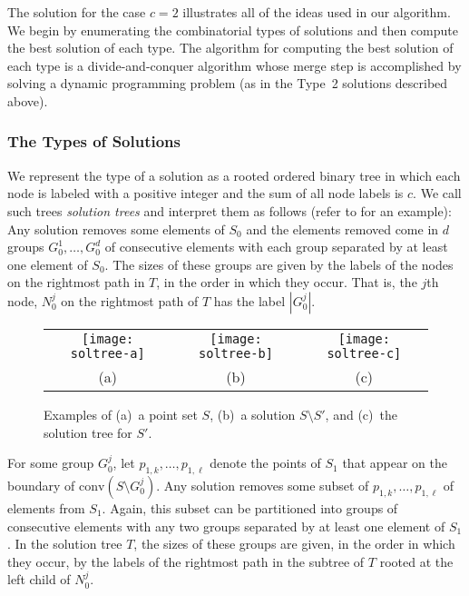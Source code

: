 \documentclass{elsart}
\newcommand{\ch}{\mathrm{conv}}
\begin{document}
The solution for the case $c=2$ illustrates all of the ideas used in 
our algorithm.  We begin by enumerating the combinatorial types of
solutions and then compute the best solution of each type.  The
algorithm for computing the best solution of each type is a
divide-and-conquer algorithm whose merge step is accomplished by
solving a dynamic programming problem (as in the Type~2 solutions
described above).

\subsubsection{The Types of Solutions}

We represent the type of a solution as a rooted ordered binary tree in
which each node is labeled with a positive integer and the sum of all
node labels is $c$.  We call such trees \emph{solution trees}
and interpret them as follows (refer to
 for an example): Any solution removes some
elements of $S_0$ and the elements removed come in $d$ groups
$G_0^1,\ldots,G_0^d$ of consecutive elements with each group separated
by at least one element of $S_0$.  The sizes of these groups are given
by the labels of the nodes on the rightmost path in $T$, in the order
in which they occur.  That is, the $j$th node, $N_0^j$ on the
rightmost path of $T$ has the label $|G_0^j|$. 

\begin{figure}
\begin{center}
\begin{tabular}{ccc}
\texttt{[image: soltree-a]} & 
\texttt{[image: soltree-b]} &
\texttt{[image: soltree-c]} \\
(a) & (b) & (c)
\end{tabular}
\end{center}
\caption{Examples of (a)~a point set $S$, (b)~a solution
$S\setminus S'$, and (c)~the solution tree for $S'$.}
\end{figure}

For some group $G_0^j$, let $p_{1,k}, \ldots, p_{1,\ell}$ denote the
points of $S_1$ that appear on the boundary of $\ch(S\setminus
G_0^j)$.  Any solution removes some subset of $p_{1,k},\ldots,
p_{1,\ell}$ of elements from $S_1$.  Again, this subset can be
partitioned into groups of consecutive elements with any two groups
separated by at least one element of $S_1$.  In the solution tree $T$,
the sizes of these groups are given, in the order in which they occur,
by the labels of the rightmost path in the subtree of $T$ rooted at
the left child of $N_0^j$.
\end{document}

